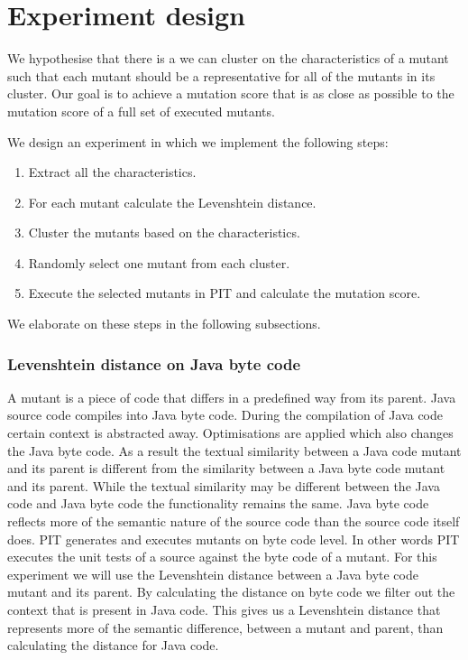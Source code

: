 \documentclass[../main]{subfiles}
\begin{document}
\chapter{Experiment design}
We hypothesise that there is a we can cluster on the characteristics of a mutant such that each mutant should be a representative for all of the mutants in its cluster.
Our goal is to achieve a mutation score that is as close as possible to the mutation score of a full set of executed mutants.

We design an experiment in which we implement the following steps:
\begin{enumerate}
    \item Extract all the characteristics.
    \item For each mutant calculate the Levenshtein distance.
    \item Cluster the mutants based on the characteristics.
    \item Randomly select one mutant from each cluster.
    \item Execute the selected mutants in PIT and calculate the mutation score.
\end{enumerate}
We elaborate on these steps in the following subsections.

\subsection{Levenshtein distance on Java byte code}
A mutant is a piece of code that differs in a predefined way from its parent.
Java source code compiles into Java byte code.
During the compilation of Java code certain context is abstracted away\cite{byteCodeEngineering}.
Optimisations are applied which also changes the Java byte code\cite{byteCodeEngineering}.
As a result the textual similarity between a Java code mutant and its parent is different from the similarity between a Java byte code mutant and its parent.
While the textual similarity may be different between the Java code and Java byte code the functionality remains the same.
Java byte code reflects more of the semantic nature of the source code than the source code itself does. 
\newline
PIT generates and executes mutants on byte code level\cite{pitestBytecode}. 
In other words PIT executes the unit tests of a source against the byte code of a mutant.
\newline
For this experiment we will use the Levenshtein distance between a Java byte code mutant and its parent.
By calculating the distance on byte code we filter out the context that is present in Java code.
This gives us a Levenshtein distance that represents more of the semantic difference, between a mutant and parent, than calculating the distance for Java code.
\end{document}
